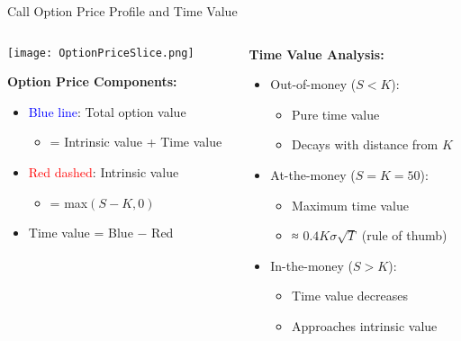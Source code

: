 \documentclass{beamer}
\begin{document}
\begin{frame}{Call Option Price Profile and Time Value}
    \begin{columns}
        \begin{column}{0.5\textwidth}
            \vspace{-0.5cm}
            \texttt{[image: OptionPriceSlice.png]}
            \vspace{0.3cm}
            
            \textbf{Option Price Components:}
            \begin{itemize}
                \item \textcolor{blue}{Blue line}: Total option value
                    \begin{itemize}
                        \item = Intrinsic value + Time value
                    \end{itemize}
                \item \textcolor{red}{Red dashed}: Intrinsic value
                    \begin{itemize}
                        \item = max$(S-K, 0)$
                    \end{itemize}
                \item Time value = Blue $-$ Red
            \end{itemize}
        \end{column}
        
        \begin{column}{0.5\textwidth}
            \textbf{Time Value Analysis:}
            \begin{itemize}
                \item Out-of-money ($S < K$):
                    \begin{itemize}
                        \item Pure time value
                        \item Decays with distance from $K$
                    \end{itemize}
                \item At-the-money ($S = K = 50$):
                    \begin{itemize}
                        \item Maximum time value
                        \item ≈ $0.4K\sigma\sqrt{T}$ (rule of thumb)
                    \end{itemize}
                \item In-the-money ($S > K$):
                    \begin{itemize}
                        \item Time value decreases
                        \item Approaches intrinsic value
                    \end{itemize}
            \end{itemize}
            

\end{column}
\end{columns}
\end{frame}
\end{document}

